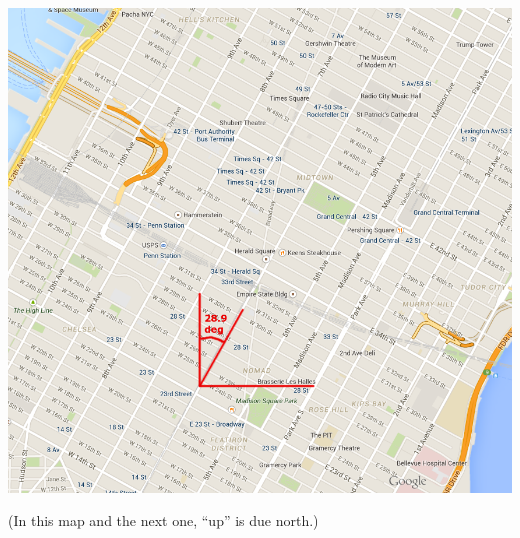 \documentclass[12pt]{article}
\begin{document}
\begin{minipage}{0.48\textwidth}
	
	\begin{center}


	\includegraphics[width=\textwidth]{manhattan-1.png}
	
	(In this map and the next one, “up” is due north.)
	\end{center}
\end{minipage}

\newpage
\end{document}
